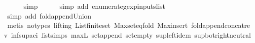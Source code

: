 \begin{isabellebody}
\ \ \ \ \isamarkupfalse%
\ simp\isanewline
\ \ \ \ \isamarkupfalse%
\ {\isacharparenleft}simp\ add{\isacharcolon}\ enumerate{\isacharunderscore}gexp{\isacharunderscore}inputs{\isacharunderscore}list{\isacharparenright}\isanewline
\ \ \ \ \isamarkupfalse%
\ {\isacharparenleft}simp\ add{\isacharcolon}\ fold{\isacharunderscore}append{\isacharunderscore}Union{\isacharparenright}\isanewline
\ \ \ \ \isamarkupfalse%
\ {\isacharparenleft}metis\ {\isacharparenleft}no{\isacharunderscore}types{\isacharcomma}\ lifting{\isacharparenright}\ List{\isachardot}finite{\isacharunderscore}set\ Max{\isachardot}set{\isacharunderscore}eq{\isacharunderscore}fold\ Max{\isacharunderscore}insert\ fold{\isacharunderscore}append{\isacharunderscore}concat{\isacharunderscore}rev\ inf{\isacharunderscore}sup{\isacharunderscore}aci{\isacharparenleft}{}{\isacharparenright}\ list{\isachardot}simps{\isacharparenleft}{}{}{\isacharparenright}\ max{\isacharunderscore}{}L\ set{\isacharunderscore}append\ set{\isacharunderscore}empty\ sup{\isachardot}left{\isacharunderscore}idem\ sup{\isacharunderscore}bot{\isachardot}right{\isacharunderscore}neutral{\isacharparenright}\isanewline
{}\isamarkupfalse%
%
\endisatagproof
{\isafoldproof}%
%
\isadelimproof
\isanewline
%
\endisadelimproof
%
\isadelimtheory
\isanewline
%
\endisadelimtheory
%
\isatagtheory
{}\isamarkupfalse%
%
\endisatagtheory
{\isafoldtheory}%
%
\isadelimtheory
%
\endisadelimtheory
%
\end{isabellebody}%
\endinput
